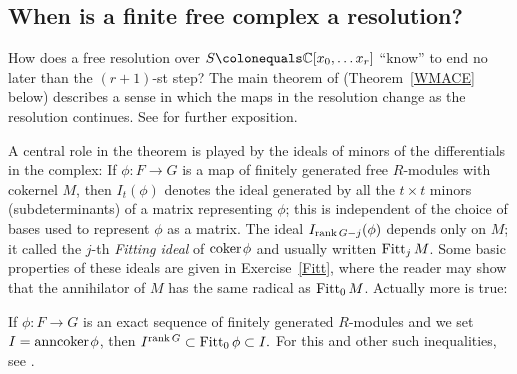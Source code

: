 
\subsection*{When is a finite free complex a resolution?}
How does a free resolution over $S \colonequals  \CC[x_0, \dots x_r]$
``know'' to end no later than the $(r+1)$-st step?
The main theorem of \cite{WMACE} (Theorem~\ref{WMACE} below)
describes a sense in which the maps in the resolution
change as the resolution continues. See \cite[Theorem 20.9]{Eisenbud1995}
for further exposition.

A central role in the theorem is played by the ideals of minors of the
differentials in the complex: If $\phi: F\to G$ is a map of finitely
generated free $R$-modules with cokernel $M$, then
$I_t(\phi)$ 
%
denotes the ideal generated by all the $t\times t$ minors
(subdeterminants) of a matrix representing $\phi$; this is independent
of the choice of bases used to represent $\phi$ as a matrix.
The ideal $I_{\operatorname{rank} G -j}(\phi)$ depends only on $M$; it called the
$j$-th \emph{Fitting ideal} of ${\rm{coker}\kern1pt} \phi$  and
%
%
%
usually written $\operatorname{Fitt}_{j} M$. Some basic properties of these ideals are
given in Exercise~\ref{Fitt}, where the reader may show that the
annihilator of $M$ has the
same radical as $\operatorname{Fitt}_{0} M$. Actually more is true:

\begin{fact}
If $\phi: F\to G$ is an exact sequence of finitely generated
$R$-modules and we set $I = {\rm{ann}}{\rm{coker}\kern1pt} \phi$, then
$
I^{\operatorname{rank} G}\subset \operatorname{Fitt}_{0}\phi \subset
I.
$
For this and other such inequalities, see \cite{MR476736}.
\end{fact}


